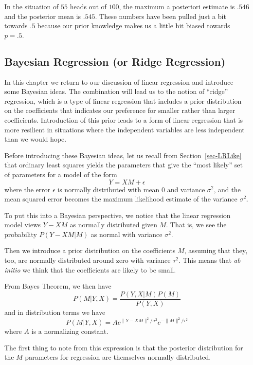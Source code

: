 \documentclass[
  11pt,
  letterpaper,
]{scrbook}
\theoremstyle{plain}
\theoremstyle{plain}
\theoremstyle{remark}
\begin{document}
In the situation of \(55\) heads out of \(100\), the maximum a
posteriori estimate is \(.546\) and the posterior mean is \(.545\).
These numbers have been pulled just a bit towards \(.5\) because our
prior knowledge makes us a little bit biased towards \(p=.5\).

\hypertarget{bayesian-regression-or-ridge-regression}{%
\subsection{Bayesian Regression (or Ridge
Regression)}\label{bayesian-regression-or-ridge-regression}}

In this chapter we return to our discussion of linear regression and
introduce some Bayesian ideas. The combination will lead us to the
notion of ``ridge'' regression, which is a type of linear regression
that includes a prior distribution on the coefficients that indicates
our preference for smaller rather than larger coefficients. Introduction
of this prior leads to a form of linear regression that is more
resilient in situations where the independent variables are less
independent than we would hope.

Before introducing these Bayesian ideas, let us recall from
Section~\ref{sec-LRLike} that ordinary least squares yields the
parameters that give the ``most likely'' set of parameters for a model
of the form \[
Y=XM + \epsilon
\] where the error \(\epsilon\) is normally distributed with mean \(0\)
and variance \(\sigma^2\), and the mean squared error becomes the
maximum likelihood estimate of the variance \(\sigma^2\).

To put this into a Bayesian perspective, we notice that the linear
regression model views \(Y-XM\) as normally distributed given \(M\).
That is, we see the probability \(P(Y-XM|M)\) as normal with variance
\(\sigma^2\).

Then we introduce a prior distribution on the coefficients \(M\),
assuming that they, too, are normally distributed around zero with
variance \(\tau^2\). This means that \emph{ab initio} we think that the
coefficients are likely to be small.

From Bayes Theorem, we then have \[
P(M|Y,X) = \frac{P(Y,X|M)P(M)}{P(Y,X)}
\] and in distribution terms we have \[
P(M|Y,X) = Ae^{\|Y-XM\|^2/\sigma^2}e^{-\|M\|^2/\tau^{2}}
\] where \(A\) is a normalizing constant.

The first thing to note from this expression is that the posterior
distribution for the \(M\) parameters for regression are themselves
normally distributed.
\end{document}
